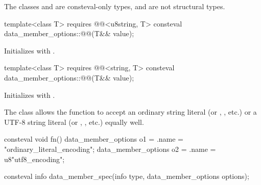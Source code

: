 \pnum
The classes 
and 
are consteval-only types,
and are not structural types.

\begin{itemdecl}
template<class T>
  requires @@<u8string, T>
  consteval data_member_options::@@(T&& value);
\end{itemdecl}

\begin{itemdescr}
\pnum
\effects
Initializes 
with .
\end{itemdescr}

\begin{itemdecl}
template<class T>
  requires @@<string, T>
  consteval data_member_options::@@(T&& value);
\end{itemdecl}

\begin{itemdescr}
\pnum
\effects
Initializes 
with .
\begin{note}
The class  allows
the function  to accept
an ordinary string literal (or , , etc.)
or a UTF-8 string literal (or , , etc.)
equally well.
\begin{example}
\begin{codeblock}
consteval void fn() {
  data_member_options o1 = {.name = "ordinary_literal_encoding"};
  data_member_options o2 = {.name = u8"utf8_encoding"};
}
\end{codeblock}
\end{example}
\end{note}
\end{itemdescr}

%
\begin{itemdecl}
consteval info data_member_spec(info type, data_member_options options);
\end{itemdecl}

